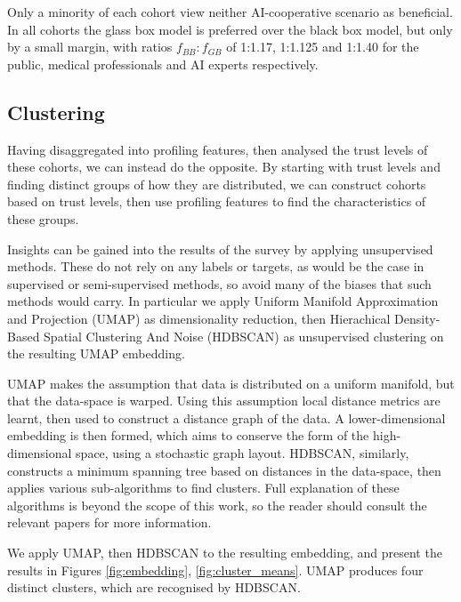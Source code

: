 \documentclass[manuscript,screen,review]{acmart}
\begin{document}
Only a minority of each cohort view neither AI-cooperative scenario as beneficial. In all cohorts the glass box model is preferred over the black box model, but only by a small margin, with ratios $f_{BB}:f_{GB}$ of 1:1.17, 1:1.125 and 1:1.40 for the public, medical professionals and AI experts respectively. 


\subsection{Clustering}

Having disaggregated into profiling features, then analysed the trust levels of these cohorts, we can instead do the opposite. By starting with trust levels and finding distinct groups of how they are distributed, we can construct cohorts based on trust levels, then use profiling features to find the characteristics of these groups.

Insights can be gained into the results of the survey by applying unsupervised methods. These do not rely on any labels or targets, as would be the case in supervised or semi-supervised methods, so avoid many of the biases that such methods would carry. In particular we apply Uniform Manifold Approximation and Projection (UMAP) \cite{McInnes2018} as dimensionality reduction, then Hierachical Density-Based Spatial Clustering And Noise (HDBSCAN) \cite{McInnes2017} as unsupervised clustering on the resulting UMAP embedding. 

UMAP makes the assumption that data is distributed on a uniform manifold, but that the data-space is warped. Using this assumption local distance metrics are learnt, then used to construct a distance graph of the data. A lower-dimensional embedding is then formed, which aims to conserve the form of the high-dimensional space, using a stochastic graph layout. HDBSCAN, similarly, constructs a minimum spanning tree based on distances in the data-space, then applies various sub-algorithms to find clusters. Full explanation of these algorithms is beyond the scope of this work, so the reader should consult the relevant papers for more information.

We apply UMAP, then HDBSCAN to the resulting embedding, and present the results in Figures \ref{fig:embedding}, \ref{fig:cluster_means}. UMAP produces four distinct clusters, which are recognised by HDBSCAN. 
\end{document}
